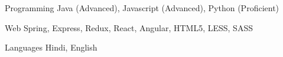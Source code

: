 

\begin{cvskills}

  \cvskill
    {Programming} %
    {Java (Advanced), Javascript (Advanced), Python (Proficient)} %

  \cvskill
    {Web} %
    {Spring, Express, Redux, React, Angular, HTML5, LESS, SASS} %

  \cvskill
    {Languages} %
    {Hindi, English} %

\end{cvskills}
